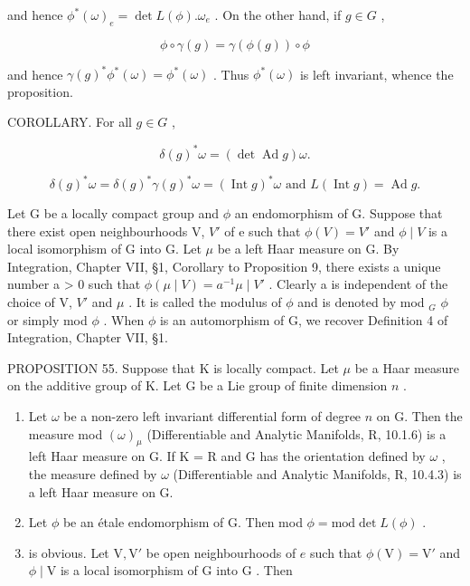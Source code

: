 and hence \(\phi^{*}(\omega)_{e} = \det L(\phi). \omega_{e}\) . On the other hand, if \(g \in G\) ,

\[
\phi \circ \gamma (g) = \gamma (\phi (g)) \circ \phi
\]

and hence \(\gamma(g)^{*}\phi^{*}(\omega)=\phi^{*}(\omega)\) . Thus \(\phi^{*}(\omega)\) is left invariant, whence the proposition.

COROLLARY. For all \(g \in G\) ,

\[
\delta (g) ^ {*} \omega = (\det \operatorname{Ad} g) \omega .
\]

\[
\delta (g) ^ {*} \omega = \delta (g) ^ {*} \gamma (g) ^ {*} \omega = (\operatorname{Int} g) ^ {*} \omega \text {   and   } L (\operatorname{Int} g) = \operatorname{Ad} g.
\]

Let G be a locally compact group and \(\phi\) an endomorphism of G. Suppose that there exist open neighbourhoods V, \(V'\) of e such that \(\phi(V) = V'\) and \(\phi \mid V\) is a local isomorphism of G into G. Let \(\mu\) be a left Haar measure on G. By Integration, Chapter VII, §1, Corollary to Proposition 9, there exists a unique number a \textgreater{} 0 such that \(\phi(\mu \mid V) = a^{-1}\mu \mid V'\) . Clearly a is independent of the choice of V, \(V'\) and \(\mu\) . It is called the modulus of \(\phi\) and is denoted by mod \(_{G}\) \(\phi\) or simply mod \(\phi\) . When \(\phi\) is an automorphism of G, we recover Definition 4 of Integration, Chapter VII, §1.

PROPOSITION 55. Suppose that K is locally compact. Let \(\mu\) be a Haar measure on the additive group of K. Let G be a Lie group of finite dimension \(n\) .

\begin{enumerate}
\def\labelenumi{(\roman{enumi})}
\item
  Let \(\omega\) be a non-zero left invariant differential form of degree \(n\) on G. Then the measure mod \((\omega)_{\mu}\) (Differentiable and Analytic Manifolds, R, 10.1.6) is a left Haar measure on G. If K = R and G has the orientation defined by \(\omega\) , the measure defined by \(\omega\) (Differentiable and Analytic Manifolds, R, 10.4.3) is a left Haar measure on G.
\item
  Let \(\phi\) be an étale endomorphism of G. Then mod \(\phi = \text{mod}\det L(\phi)\) .
\item
  is obvious. Let \(\mathrm{V}, \mathrm{V}'\) be open neighbourhoods of \(e\) such that \(\phi(\mathrm{V}) = \mathrm{V}'\) and \(\phi \mid \mathrm{V}\) is a local isomorphism of \(\mathrm{G}\) into \(\mathrm{G}\) . Then
\end{enumerate}

